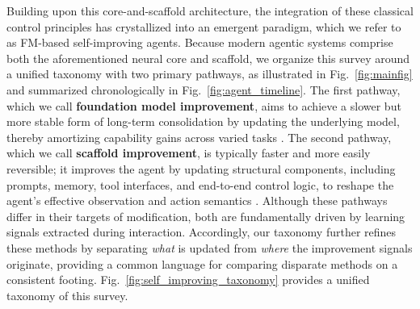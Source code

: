 \documentclass{article}
\begin{document}
Building upon this core-and-scaffold architecture, the integration of these classical control principles has crystallized into an emergent paradigm, which we refer to as FM-based self-improving agents. Because modern agentic systems comprise both the aforementioned neural core and scaffold, we organize this survey around a unified taxonomy with two primary pathways, as illustrated in Fig.~\ref{fig:mainfig} and summarized chronologically in Fig.~\ref{fig:agent_timeline}. The first pathway, which we call \textbf{foundation model improvement}, aims to achieve a slower but more stable form of long-term consolidation by updating the underlying model, thereby amortizing capability gains across varied tasks \citep{huang2023large, zhao2024selfguidebettertaskspecificinstruction, wang2025improvingmodelalignmentcollective, xiao2025uigenie, bougie2026alignuserhumanalignedllmagents}. The second pathway, which we call \textbf{scaffold improvement}, is typically faster and more easily reversible; it improves the agent by updating structural components, including prompts, memory, tool interfaces, and end-to-end control logic, to reshape the agent’s effective observation and action semantics \citep{fernando2024promptbreeder, chhikara2025mem0buildingproductionreadyai, wölflein2025llmagentsmakingagent, zhang2025darwingodelmachineopenended, borthwick2026robophdselfimprovingtexttosqlautonomous}. Although these pathways differ in their targets of modification, both are fundamentally driven by learning signals extracted during interaction. Accordingly, our taxonomy further refines these methods by separating \textit{what} is updated from \textit{where} the improvement signals originate, providing a common language for comparing disparate methods on a consistent footing. Fig.~\ref{fig:self_improving_taxonomy} provides a unified taxonomy of this survey.
\end{document}
